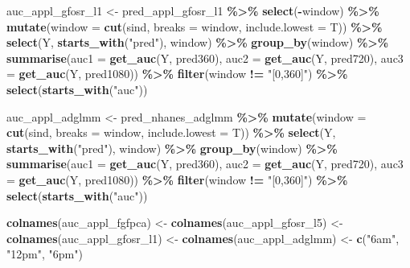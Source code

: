 \documentclass[
]{article}
\newenvironment{Shaded}{\begin{snugshade}}{\end{snugshade}}
\newcommand{\AttributeTok}[1]{\textcolor[rgb]{0.13,0.29,0.53}{#1}}
\newcommand{\FunctionTok}[1]{\textcolor[rgb]{0.13,0.29,0.53}{\textbf{#1}}}
\newcommand{\NormalTok}[1]{#1}
\newcommand{\OtherTok}[1]{\textcolor[rgb]{0.56,0.35,0.01}{#1}}
\newcommand{\SpecialCharTok}[1]{\textcolor[rgb]{0.81,0.36,0.00}{\textbf{#1}}}
\newcommand{\StringTok}[1]{\textcolor[rgb]{0.31,0.60,0.02}{#1}}
\begin{document}
\begin{Shaded}
\begin{Highlighting}[]
\NormalTok{auc\_appl\_gfosr\_l1 }\OtherTok{\textless{}{-}}\NormalTok{ pred\_appl\_gfosr\_l1 }\SpecialCharTok{\%\textgreater{}\%} 
  \FunctionTok{select}\NormalTok{(}\SpecialCharTok{{-}}\NormalTok{window) }\SpecialCharTok{\%\textgreater{}\%}
    \FunctionTok{mutate}\NormalTok{(}\AttributeTok{window =} \FunctionTok{cut}\NormalTok{(sind, }\AttributeTok{breaks =}\NormalTok{ window, }\AttributeTok{include.lowest =}\NormalTok{ T)) }\SpecialCharTok{\%\textgreater{}\%} 
    \FunctionTok{select}\NormalTok{(Y, }\FunctionTok{starts\_with}\NormalTok{(}\StringTok{"pred"}\NormalTok{), window) }\SpecialCharTok{\%\textgreater{}\%}
    \FunctionTok{group\_by}\NormalTok{(window) }\SpecialCharTok{\%\textgreater{}\%}
    \FunctionTok{summarise}\NormalTok{(}\AttributeTok{auc1 =} \FunctionTok{get\_auc}\NormalTok{(Y, pred360),}
              \AttributeTok{auc2 =} \FunctionTok{get\_auc}\NormalTok{(Y, pred720),}
              \AttributeTok{auc3 =} \FunctionTok{get\_auc}\NormalTok{(Y, pred1080)) }\SpecialCharTok{\%\textgreater{}\%}
    \FunctionTok{filter}\NormalTok{(window }\SpecialCharTok{!=} \StringTok{"[0,360]"}\NormalTok{) }\SpecialCharTok{\%\textgreater{}\%} 
    \FunctionTok{select}\NormalTok{(}\FunctionTok{starts\_with}\NormalTok{(}\StringTok{"auc"}\NormalTok{))}

\NormalTok{auc\_appl\_adglmm }\OtherTok{\textless{}{-}}\NormalTok{ pred\_nhanes\_adglmm }\SpecialCharTok{\%\textgreater{}\%}
    \FunctionTok{mutate}\NormalTok{(}\AttributeTok{window =} \FunctionTok{cut}\NormalTok{(sind, }\AttributeTok{breaks =}\NormalTok{ window, }\AttributeTok{include.lowest =}\NormalTok{ T)) }\SpecialCharTok{\%\textgreater{}\%} 
    \FunctionTok{select}\NormalTok{(Y, }\FunctionTok{starts\_with}\NormalTok{(}\StringTok{"pred"}\NormalTok{), window) }\SpecialCharTok{\%\textgreater{}\%}
    \FunctionTok{group\_by}\NormalTok{(window) }\SpecialCharTok{\%\textgreater{}\%}
    \FunctionTok{summarise}\NormalTok{(}\AttributeTok{auc1 =} \FunctionTok{get\_auc}\NormalTok{(Y, pred360),}
              \AttributeTok{auc2 =} \FunctionTok{get\_auc}\NormalTok{(Y, pred720),}
              \AttributeTok{auc3 =} \FunctionTok{get\_auc}\NormalTok{(Y, pred1080)) }\SpecialCharTok{\%\textgreater{}\%}
    \FunctionTok{filter}\NormalTok{(window }\SpecialCharTok{!=} \StringTok{"[0,360]"}\NormalTok{) }\SpecialCharTok{\%\textgreater{}\%} 
    \FunctionTok{select}\NormalTok{(}\FunctionTok{starts\_with}\NormalTok{(}\StringTok{"auc"}\NormalTok{))}

\FunctionTok{colnames}\NormalTok{(auc\_appl\_fgfpca) }\OtherTok{\textless{}{-}} \FunctionTok{colnames}\NormalTok{(auc\_appl\_gfosr\_l5) }\OtherTok{\textless{}{-}} \FunctionTok{colnames}\NormalTok{(auc\_appl\_gfosr\_l1) }\OtherTok{\textless{}{-}} \FunctionTok{colnames}\NormalTok{(auc\_appl\_adglmm) }\OtherTok{\textless{}{-}} \FunctionTok{c}\NormalTok{(}\StringTok{"6am"}\NormalTok{, }\StringTok{"12pm"}\NormalTok{, }\StringTok{"6pm"}\NormalTok{)}
\end{Highlighting}
\end{Shaded}
\end{document}

